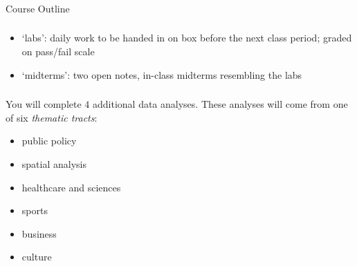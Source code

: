 \documentclass[xetex,mathserif,serif,aspectratio=169]{beamer}
\begin{document}






\begin{frame}[fragile] \frametitle{}

\begin{flushright}
{\sc\fontsize{1cm}{0cm}\selectfont \textcolor{solarized@blue}{Course Outline}}
\end{flushright}

\end{frame}

\begin{frame}[fragile] \frametitle{}


\begin{itemize}
\item `labs': daily work to be handed in on box before the next
  class period; graded on pass/fail scale
\item `midterms': two open notes, in-class midterms resembling the
  labs
\end{itemize}

\end{frame}

\begin{frame}[fragile] \frametitle{}


You will complete $4$ additional data analyses.
These analyses will come from one of six \textit{thematic
tracts}:

\begin{itemize}\setlength\itemsep{0em}
\item public policy
\item spatial analysis
\item healthcare and sciences
\item sports
\item business
\item culture
\end{itemize}

\end{frame}

\begin{frame}[fragile] \frametitle{}

{\fontsize{0.6cm}{0cm}\selectfont {} }

\end{frame}
\end{document}
